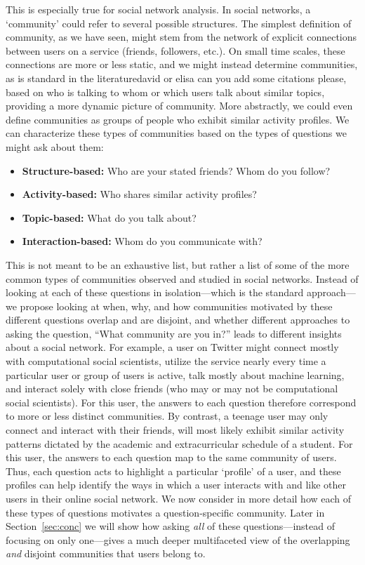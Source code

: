 This is especially true for social network analysis. In social networks, a `community' could refer to several possible structures. The simplest definition of community, as we have seen, might stem from the network of explicit connections between users on a service (friends, followers, etc.). On small time scales, these connections are more or less static, and we might instead determine communities, as is standard in the literature\alert{david or elisa can you add some citations please}\cite{}, based on who is talking to whom or which users talk about similar topics, providing a more dynamic picture of community.
More abstractly, we could even define communities as groups of people who exhibit similar activity profiles. We can characterize these types of communities based on the types of questions we might ask about them:
\begin{itemize}
	\item \textbf{Structure-based:} Who are your stated friends? Whom do you follow?
	\item \textbf{Activity-based:} Who shares similar activity profiles?
	\item \textbf{Topic-based:} What do you talk about?
	\item \textbf{Interaction-based:} Whom do you communicate with?
\end{itemize}

This is not meant to be an exhaustive list, but rather a list of some of the more common types of communities observed and studied in social networks. Instead of looking at each of these questions in isolation---which is the standard approach---we propose looking at when, why, and how communities motivated by these different questions overlap and are disjoint, and whether different approaches to asking the question, ``What community are you in?'' leads to different insights about a social network. For example, a user on Twitter might connect mostly with computational social scientists, utilize the service nearly every time a particular user or group of users is active, talk mostly about machine learning, and interact solely with close friends (who may or may not be computational social scientists). 
For this user, the answers to each question therefore correspond to more or less distinct communities. By contrast, a teenage user may only connect and interact with their friends, will most likely exhibit similar activity patterns dictated by the academic and extracurricular schedule of a student. For this user, the answers to each question map to the same community of users.
Thus, each question acts to highlight a particular `profile' of a user, and these profiles can help identify the ways in which a user interacts with and like other users in their online social network. 
We now consider in more detail how each of these types of questions motivates a question-specific community. Later in Section~\ref{sec:conc} we will show how asking \emph{all} of these questions---instead of focusing on only one---gives a much deeper multifaceted view of the overlapping \emph{and} disjoint communities that users belong to. 

